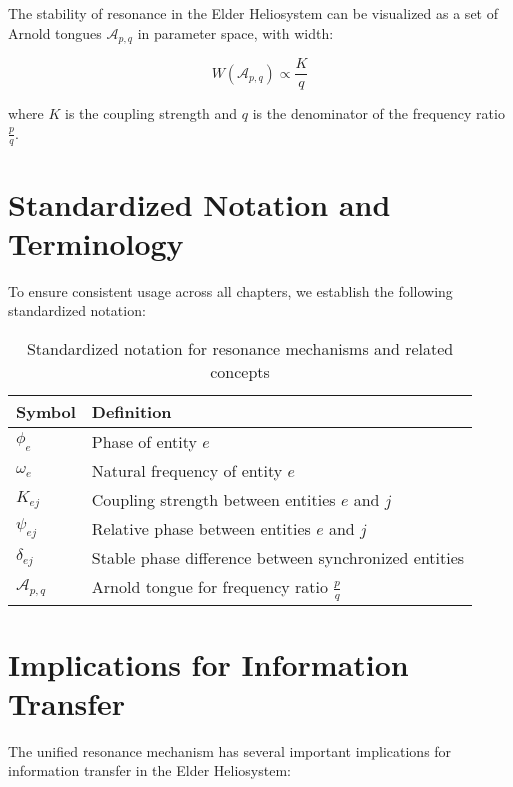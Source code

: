 \begin{corollary}
The stability of resonance in the Elder Heliosystem can be visualized as a set of Arnold tongues $\mathcal{A}_{p,q}$ in parameter space, with width:

\begin{equation}
W(\mathcal{A}_{p,q}) \propto \frac{K}{q}
\end{equation}

where $K$ is the coupling strength and $q$ is the denominator of the frequency ratio $\frac{p}{q}$.
\end{corollary}

\section{Standardized Notation and Terminology}

To ensure consistent usage across all chapters, we establish the following standardized notation:

\begin{table}[h]
\centering
\begin{tabular}{|l|l|}
\hline
\textbf{Symbol} & \textbf{Definition} \\
\hline
$\phi_e$ & Phase of entity $e$ \\
$\omega_e$ & Natural frequency of entity $e$ \\
$K_{ej}$ & Coupling strength between entities $e$ and $j$ \\
$\psi_{ej}$ & Relative phase between entities $e$ and $j$ \\
$\delta_{ej}$ & Stable phase difference between synchronized entities \\
$\mathcal{A}_{p,q}$ & Arnold tongue for frequency ratio $\frac{p}{q}$ \\
\hline
\end{tabular}
\caption{Standardized notation for resonance mechanisms and related concepts}
\end{table}

\section{Implications for Information Transfer}

The unified resonance mechanism has several important implications for information transfer in the Elder Heliosystem:

